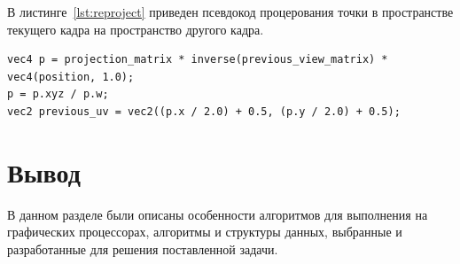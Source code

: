 В листинге~\ref{lst:reproject} приведен псевдокод процерования точки в пространстве 
текущего кадра на пространство другого кадра.

\begin{lstlisting}[caption={Проецирование одного кадра на другой},label={lst:reproject},frame=single]
vec4 p = projection_matrix * inverse(previous_view_matrix) * vec4(position, 1.0);
p = p.xyz / p.w;
vec2 previous_uv = vec2((p.x / 2.0) + 0.5, (p.y / 2.0) + 0.5);
\end{lstlisting}

\section*{Вывод}

В данном разделе были описаны особенности алгоритмов для выполнения
на графических процессорах, алгоритмы и структуры данных, выбранные 
и разработанные для решения поставленной задачи. 
